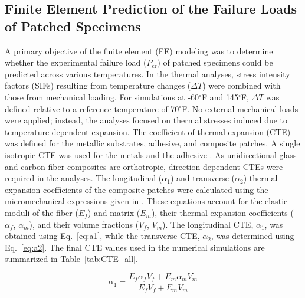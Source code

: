 \documentclass[journal,article,submit,pdftex,moreauthors]{Definitions/mdpi}
\begin{document}
\subsection{Finite Element Prediction of the Failure Loads of Patched Specimens}

A primary objective of the finite element (FE) modeling was to determine whether the experimental failure load ($P_{\mathrm{cr}}$) of patched specimens could be predicted across various temperatures. In the thermal analyses, stress intensity factors (SIFs) resulting from temperature changes ($\Delta T$) were combined with those from mechanical loading. For simulations at -60$^\circ$F and 145$^\circ$F, $\Delta T$ was defined relative to a reference temperature of 70$^\circ$F. No external mechanical loads were applied; instead, the analyses focused on thermal stresses induced due to temperature-dependent expansion. The coefficient of thermal expansion (CTE) was defined for the metallic substrates, adhesive, and composite patches. A single isotropic CTE was used for the metals and the adhesive \cite{Callister2020}. As unidirectional glass- and carbon-fiber composites are orthotropic, direction-dependent CTEs were required in the analyses. The longitudinal ($\alpha_{1}$) and transverse ($\alpha_{2}$) thermal expansion coefficients of the composite patches were calculated using the micromechanical expressions given in \cite{Johnson1981}. These equations account for the elastic moduli of the fiber ($E_f$) and matrix ($E_m$), their thermal expansion coefficients ($\alpha_f$, $\alpha_m$), and their volume fractions ($V_f$, $V_m$). The longitudinal CTE, $\alpha_1$, was obtained using Eq.~\eqref{eq:a1}, while the transverse CTE, $\alpha_2$, was determined using Eq.~\eqref{eq:a2}. The final CTE values used in the numerical simulations are summarized in Table~\ref{tab:CTE_all}.

\begin{equation}
\alpha_1 = 
\frac{E_f \alpha_f V_f + E_m \alpha_m V_m}
     {E_f V_f + E_m V_m}
\label{eq:a1}
\end{equation}
\end{document}
